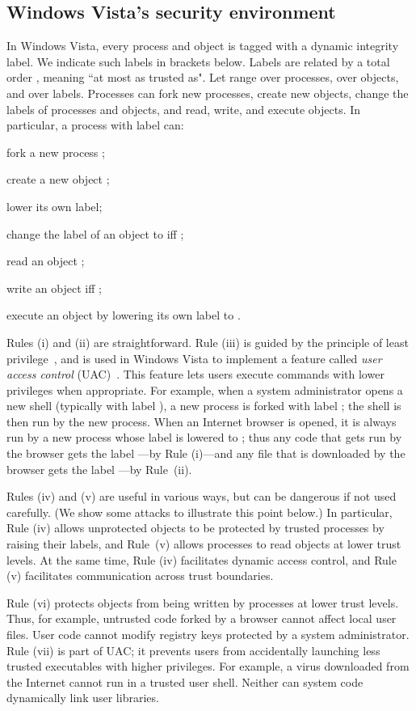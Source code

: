 \documentclass{sigplanconf}
\newcounter{compactenumc}
\newenvironment{compactenum2}
        {\begin{list}{(\roman{compactenumc})}{
        \usecounter{compactenumc}
\setlength{\leftmargin}{7mm}
        \setlength{\labelwidth}{\leftmargin}
        }}
        {\end{list}}
\begin{document}
\subsection{Windows Vista's security environment} In Windows Vista, every process and object is tagged with a dynamic integrity label. We indicate such labels in
brackets  below. Labels are related by a total order , meaning ``at most as trusted as". 
Let  range over processes,  over objects, and  over labels. Processes can fork new processes, create new objects, change the labels of processes and objects, and read, write, and execute objects. In particular, a process with label  can:
\begin{compactenum2}
\item fork a new process ; \item create a new object ; \item lower its own label; \item change the label of an object  to  iff ; \item read an object ;
\item write an object  iff ;
\item execute an object  by lowering its own label to .
\end{compactenum2} 
Rules (i) and (ii) are straightforward. 
Rule (iii) is guided by the principle of least
privilege~\cite{protection}, and is used in Windows Vista to implement a feature called \emph{user access control}
(UAC)~\cite{uac}. This feature lets users execute
commands with lower privileges when appropriate. For example, when a system administrator opens a new shell (typically with label 
), a new process is forked with label 
; the shell is then run by the new
process. When an Internet browser is opened, it is always run by a
new process whose label is lowered to ; thus any code
that gets run by the browser gets the label ---by Rule (i)---and any file that is downloaded by the browser gets the label ---by Rule~(ii).   

Rules (iv) and (v) are useful in various ways, but can be dangerous if not used carefully. (We show some attacks to illustrate this point below.) In particular, Rule (iv) allows unprotected objects to be protected by trusted processes by raising
their labels, and Rule~(v) allows processes to read objects at lower trust levels. At the same time, Rule (iv) facilitates dynamic access
control, and Rule (v) facilitates communication across trust boundaries. 

Rule (vi) protects objects from being written by processes at lower trust levels. Thus, for example, untrusted code
forked by a browser cannot affect local user files. User code cannot modify registry keys protected by a system administrator. 
Rule (vii) is part of UAC; it 
prevents users from accidentally launching less trusted executables with higher privileges. For example, a virus downloaded from the Internet cannot run
in a trusted user shell. Neither can system code dynamically link
user libraries.
\end{document}
